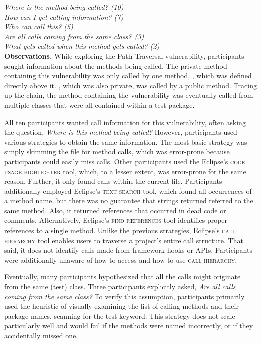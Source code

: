 \documentclass[conference]{IEEEtran}
\begin{document}
\noindent\emph{Where is the method being called? (10)} \\
\emph{How can I get calling information? (7)} \\
\emph{Who can call this? (5)} \\
\emph{Are all calls coming from the same class? (3)} \\
\emph{What gets called when this method gets called? (2)} \\



\noindent\textbf{Observations.}
While exploring the Path Traversal vulnerability, participants sought information about the methods being called. 
The private method containing this vulnerability was only called by one method, , which was defined directly above it. , which was also private, was called by a public method. Tracing up the chain, the method containing the vulnerability was eventually called from multiple classes that were all contained within a test package.

All ten participants wanted call information for this vulnerability, often asking the question, \textit{Where is this method being called?} 
However, participants used various strategies to obtain the same information.
The most basic strategy was simply skimming the file for method calls, which was error-prone because participants could easily miss calls.
Other participants used the Eclipse's \textsc{code usage highlighter} tool, which, to a lesser extent, was error-prone for the same reason. Further, it only found calls within the current file.
Participants additionally employed Eclipse's \textsc{text search} tool, which found all occurrences of a method name, but there was no guarantee that strings returned referred to the same method. Also, it returned references that occurred in dead code or comments.
Alternatively, Eclipse's \textsc{find references} tool identifies proper references to a single method.
Unlike the previous strategies, Eclipse's \textsc{call hierarchy} tool enables users to traverse a project's entire call structure.
That said, it does not identify calls made from framework hooks or APIs.
Participants were additionally unaware of how to access and how to use \textsc{call hierarchy}.

Eventually, many participants hypothesized that all the calls might originate from the same (test) class. Three participants explicitly asked, \textit{Are all calls coming from the same class?} To verify this assumption, participants primarily used the heuristic of visually examining the list of calling methods and their package names, scanning for the test keyword. This strategy does not scale particularly well and would fail if the methods were named incorrectly, or if they accidentally missed one.
\\
\end{document}
